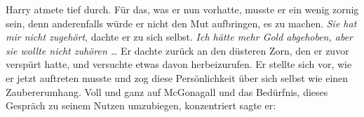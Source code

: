 Harry atmete tief durch. Für das, was er nun vorhatte, musste er ein wenig zornig sein, denn anderenfalls würde er nicht den Mut aufbringen, es zu machen. \emph{Sie hat mir nicht zugehört}, dachte er zu sich selbst. \emph{Ich hätte mehr Gold abgehoben, aber sie wollte nicht zuhören …} Er dachte zurück an den düsteren Zorn, den er zuvor verspürt hatte, und versuchte etwas davon herbeizurufen. Er stellte sich vor, wie er jetzt auftreten musste und zog diese Persönlichkeit über sich selbst wie einen Zaubererumhang. Voll und ganz auf McGonagall und das Bedürfnis, dieses Gespräch zu seinem Nutzen umzubiegen, konzentriert sagte er:

